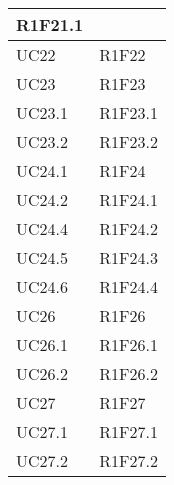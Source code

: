 \begin{center}
\begin{longtable}{|p{44mm}|p{22mm}|}
R1F21.1 \newline
\\
\hline
UC22 &

R1F22 \newline
\\
\hline
UC23 &

R1F23 \newline
\\
\hline
UC23.1 &

R1F23.1 \newline
\\
\hline
UC23.2 &

R1F23.2 \newline
\\
\hline
UC24.1 &

R1F24 \newline
\\
\hline
UC24.2 &

R1F24.1 \newline
\\
\hline
UC24.4 &

R1F24.2 \newline
\\
\hline
UC24.5 &

R1F24.3 \newline
\\
\hline
UC24.6 &

R1F24.4 \newline
\\
\hline
UC26 &

R1F26 \newline
\\
\hline
UC26.1 &

R1F26.1 \newline
\\
\hline
UC26.2 &

R1F26.2 \newline
\\
\hline
UC27 &

R1F27 \newline
\\
\hline
UC27.1 &

R1F27.1 \newline
\\
\hline
UC27.2 &

R1F27.2 \newline
\\
\hline

	\end{longtable}
\end{center}

